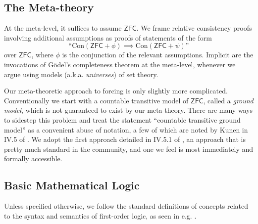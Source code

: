 \documentclass[12pt]{article}
\numberwithin{equation}{section}
\begin{document}
\subsection{The Meta-theory}\label{subs21}

At the meta-level, it suffices to assume $\mathsf{ZFC}$. We frame relative consistency proofs involving additional assumptions as proofs of statements of the form $$\text{``}\mathrm{Con}(\mathsf{ZFC} + \phi) \implies \mathrm{Con}(\mathsf{ZFC} + \psi)\text{''}$$ over $\mathsf{ZFC}$, where $\phi$ is the conjunction of the relevant assumptions. Implicit are the invocations of G\"{o}del's completeness theorem at the meta-level, whenever we argue using models (a.k.a. \emph{universes}) of set theory.

Our meta-theoretic approach to forcing is only slightly more complicated. Conventionally we start with a countable transitive model of $\mathsf{ZFC}$, called a \emph{ground model}, which is not guaranteed to exist by our meta-theory. There are many ways to sidestep this problem and treat the statement ``countable transitive ground model'' as a convenient abuse of notation, a few of which are noted by Kunen in IV.5 of \cite{kunen}. We adopt the first approach detailed in IV.5.1 of \cite{kunen}, an approach that is pretty much standard in the community, and one we feel is most immediately and formally accessible.

\subsection{Basic Mathematical Logic}

Unless specified otherwise, we follow the standard definitions of concepts related to the syntax and semantics of first-order logic, as seen in e.g. \cite{enderton}.
\end{document}
